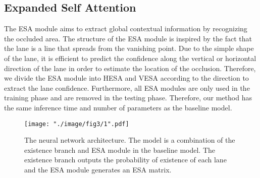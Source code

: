 \documentclass[10pt,twocolumn,letterpaper]{article}
\begin{document}
\subsection{Expanded Self Attention}
\label{ESA}
The ESA module aims to extract global contextual information by recognizing the occluded area. The structure of the ESA module is inspired by the fact that the lane is a line that spreads from the vanishing point. Due to the simple shape of the lane, it is efficient to predict the confidence along the vertical or horizontal direction of the lane in order to estimate the location of the occlusion. Therefore, we divide the ESA module into HESA and VESA according to the direction to extract the lane confidence. Furthermore, all ESA modules are only used in the training phase and are removed in the testing phase. Therefore, our method has the same inference time and number of parameters as the baseline model.

\begin{figure*}
	\setlength{\belowcaptionskip}{-10pt}
	\begin{center}
		\texttt{[image: "./image/fig3/1".pdf]}
	\end{center}
	\vspace{-7.5mm}
	\caption{The neural network architecture. The model is a combination of the existence branch and ESA module in the baseline model. The existence branch outputs the probability of existence of each lane and the ESA module generates an ESA matrix.}
	\label{fig:network}
\end{figure*}
\end{document}
